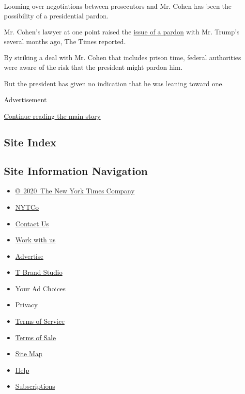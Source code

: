 Looming over negotiations between prosecutors and Mr. Cohen has been the
possibility of a presidential pardon.

Mr. Cohen's lawyer at one point raised the
\href{https://www.nytimes.com/2018/05/31/us/politics/pardons-trump.html}{issue
of a pardon} with Mr. Trump's several months ago, The Times reported.

By striking a deal with Mr. Cohen that includes prison time, federal
authorities were aware of the risk that the president might pardon him.

But the president has given no indication that he was leaning toward
one.

Advertisement

\protect\hyperlink{after-bottom}{Continue reading the main story}

\hypertarget{site-index}{%
\subsection{Site Index}\label{site-index}}

\hypertarget{site-information-navigation}{%
\subsection{Site Information
Navigation}\label{site-information-navigation}}

\begin{itemize}
\tightlist
\item
  \href{https://help.nytimes.com/hc/en-us/articles/115014792127-Copyright-notice}{©~2020~The
  New York Times Company}
\end{itemize}

\begin{itemize}
\tightlist
\item
  \href{https://www.nytco.com/}{NYTCo}
\item
  \href{https://help.nytimes.com/hc/en-us/articles/115015385887-Contact-Us}{Contact
  Us}
\item
  \href{https://www.nytco.com/careers/}{Work with us}
\item
  \href{https://nytmediakit.com/}{Advertise}
\item
  \href{http://www.tbrandstudio.com/}{T Brand Studio}
\item
  \href{https://www.nytimes.com/privacy/cookie-policy\#how-do-i-manage-trackers}{Your
  Ad Choices}
\item
  \href{https://www.nytimes.com/privacy}{Privacy}
\item
  \href{https://help.nytimes.com/hc/en-us/articles/115014893428-Terms-of-service}{Terms
  of Service}
\item
  \href{https://help.nytimes.com/hc/en-us/articles/115014893968-Terms-of-sale}{Terms
  of Sale}
\item
  \href{https://spiderbites.nytimes.com}{Site Map}
\item
  \href{https://help.nytimes.com/hc/en-us}{Help}
\item
  \href{https://www.nytimes.com/subscription?campaignId=37WXW}{Subscriptions}
\end{itemize}
